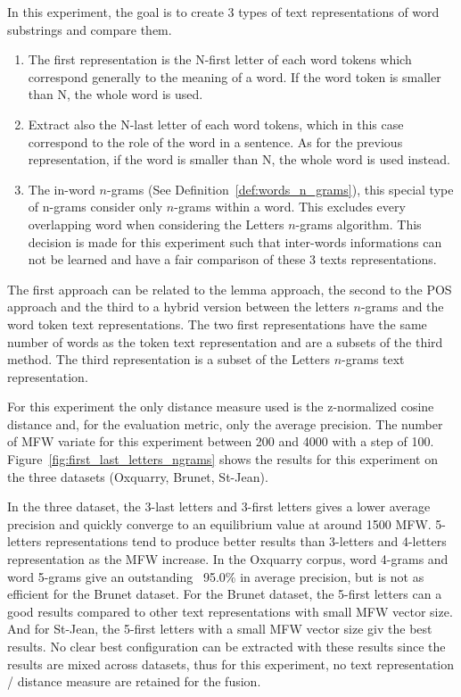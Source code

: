 In this experiment, the goal is to create 3 types of text representations of word substrings and compare them.

\begin{enumerate}
  \item
  The first representation is the N-first letter of each word tokens which correspond generally to the meaning of a word.
  If the word token is smaller than N, the whole word is used.
  \item
  Extract also the N-last letter of each word tokens, which in this case correspond to the role of the word in a sentence.
  As for the previous representation, if the word is smaller than N, the whole word is used instead.
  \item
  The in-word $n$-grams (See Definition~\ref{def:words_n_grams}), this special type of n-grams consider only $n$-grams within a word.
  This excludes every overlapping word when considering the Letters $n$-grams algorithm.
  This decision is made for this experiment such that inter-words informations can not be learned and have a fair comparison of these 3 texts representations.
\end{enumerate}

The first approach can be related to the lemma approach, the second to the POS approach and the third to a hybrid version between the letters $n$-grams and the word token text representations.
The two first representations have the same number of words as the token text representation and are a subsets of the third method.
The third representation is a subset of the Letters $n$-grams text representation.

For this experiment the only distance measure used is the z-normalized cosine distance and, for the evaluation metric, only the average precision.
The number of MFW variate for this experiment between 200 and 4000 with a step of 100.
Figure~\ref{fig:first_last_letters_ngrams} shows the results for this experiment on the three datasets (Oxquarry, Brunet, St-Jean).

In the three dataset, the 3-last letters and 3-first letters gives a lower average precision and quickly converge to an equilibrium value at around 1500 MFW.
5-letters representations tend to produce better results than 3-letters and 4-letters representation as the MFW increase.
In the Oxquarry corpus, word 4-grams and word 5-grams give an outstanding ~95.0\% in average precision, but is not as efficient for the Brunet dataset.
For the Brunet dataset, the 5-first letters can a good results compared to other text representations with small MFW vector size.
And for St-Jean, the 5-first letters with a small MFW vector size giv the best results.
No clear best configuration can be extracted with these results since the results are mixed across datasets, thus for this experiment, no text representation / distance measure are retained for the fusion.


